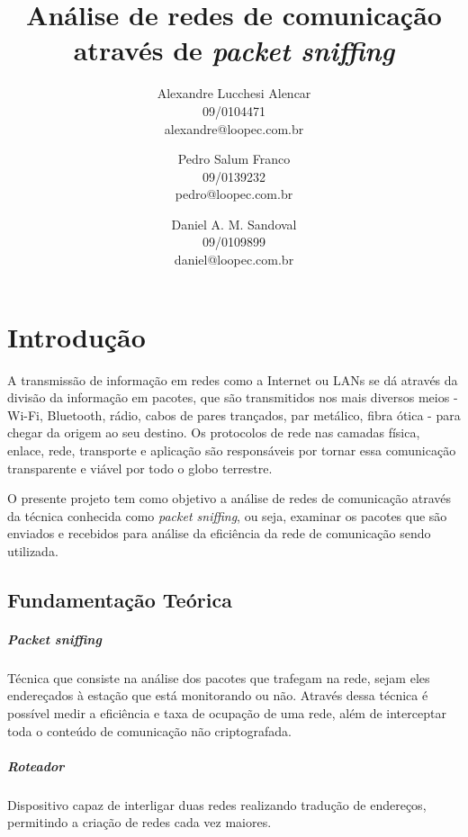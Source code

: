 \documentclass[12pt,a4paper]{report}
\title{Análise de redes de comunicação através de \textit{packet sniffing}}
\author{Alexandre Lucchesi Alencar\\
	09/0104471\\
	alexandre@loopec.com.br
	\and
	Pedro Salum Franco\\
	09/0139232\\
	pedro@loopec.com.br
	\and
	Daniel A. M. Sandoval\\
	09/0109899\\
	daniel@loopec.com.br}
\begin{document}
\maketitle

\begin{abstract}
\end{abstract}

\tableofcontents

\chapter{Introdução}
A transmissão de informação em redes como a Internet ou LANs se dá através da divisão da informação em pacotes, que são transmitidos nos mais diversos meios - Wi-Fi, Bluetooth, rádio, cabos de pares trançados, par metálico, fibra ótica - para chegar da origem ao seu destino.
Os protocolos de rede nas camadas física, enlace, rede, transporte e aplicação são responsáveis por tornar essa comunicação transparente e viável por todo o globo terrestre.

O presente projeto tem como objetivo a análise de redes de comunicação através da técnica conhecida como \textit{packet sniffing}, ou seja, examinar os pacotes que são enviados e recebidos para análise da eficiência da rede de comunicação sendo utilizada.

\section{Fundamentação Teórica}

\paragraph{\textit{Packet sniffing}} Técnica que consiste na análise dos pacotes que trafegam na rede, sejam eles endereçados à estação que está monitorando ou não. Através dessa técnica é possível medir a eficiência e taxa de ocupação de uma rede, além de interceptar toda o conteúdo de comunicação não criptografada.

\paragraph{Roteador} Dispositivo capaz de interligar duas redes realizando tradução de endereços, permitindo a criação de redes cada vez maiores.
\end{document}
